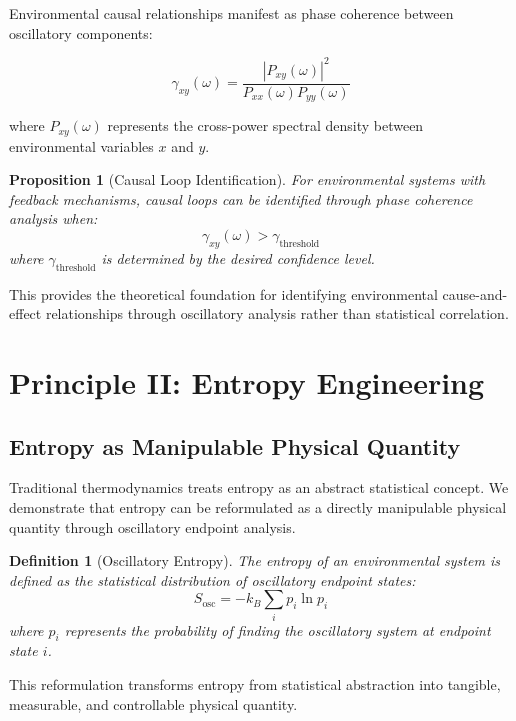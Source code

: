 \documentclass[12pt,a4paper]{article}
\newtheorem{proposition}{Proposition}
\newtheorem{definition}{Definition}
\begin{document}
Environmental causal relationships manifest as phase coherence between oscillatory components:

\begin{equation}
\gamma_{xy}(\omega) = \frac{|P_{xy}(\omega)|^2}{P_{xx}(\omega)P_{yy}(\omega)}
\end{equation}

where $P_{xy}(\omega)$ represents the cross-power spectral density between environmental variables $x$ and $y$.

\begin{proposition}[Causal Loop Identification]
For environmental systems with feedback mechanisms, causal loops can be identified through phase coherence analysis when:
\begin{equation}
\gamma_{xy}(\omega) > \gamma_{\text{threshold}}
\end{equation}
where $\gamma_{\text{threshold}}$ is determined by the desired confidence level.
\end{proposition}

This provides the theoretical foundation for identifying environmental cause-and-effect relationships through oscillatory analysis rather than statistical correlation.

\section{Principle II: Entropy Engineering}

\subsection{Entropy as Manipulable Physical Quantity}

Traditional thermodynamics treats entropy as an abstract statistical concept. We demonstrate that entropy can be reformulated as a directly manipulable physical quantity through oscillatory endpoint analysis.

\begin{definition}[Oscillatory Entropy]
The entropy of an environmental system is defined as the statistical distribution of oscillatory endpoint states:
\begin{equation}
S_{\text{osc}} = -k_B \sum_i p_i \ln p_i
\end{equation}
where $p_i$ represents the probability of finding the oscillatory system at endpoint state $i$.
\end{definition}

This reformulation transforms entropy from statistical abstraction into tangible, measurable, and controllable physical quantity.
\end{document}
